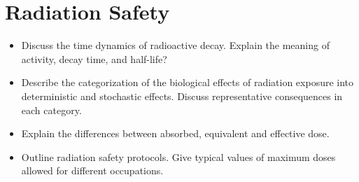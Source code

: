 \section{Radiation Safety}
\begin{itemize}

    \item Discuss the time dynamics of radioactive decay.
    Explain the meaning of activity, decay time, and half-life?

    \item Describe the categorization of the biological effects of radiation exposure into deterministic and stochastic effects.
    Discuss representative consequences in each category.

    \item Explain the differences between absorbed, equivalent and effective dose.

    \item Outline radiation safety protocols.
    Give typical values of maximum doses allowed for different occupations.

\end{itemize}


